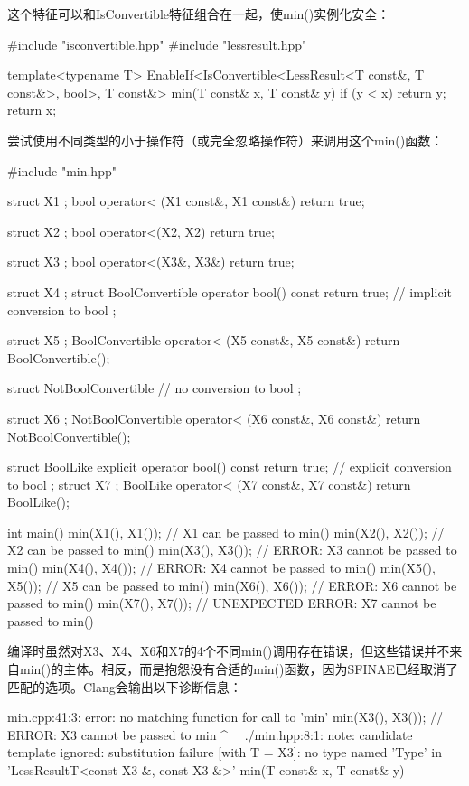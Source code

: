 这个特征可以和IsConvertible特征组合在一起，使min()实例化安全：

\begin{cpp}
#include "isconvertible.hpp"
#include "lessresult.hpp"

template<typename T>
EnableIf<IsConvertible<LessResult<T const&, T const&>, bool>,
		T const&>
min(T const& x, T const& y) {
	if (y < x) {
		return y;
	}
	return x;
}
\end{cpp}

尝试使用不同类型的小于操作符（或完全忽略操作符）来调用这个min()函数：

\begin{cpp}
#include "min.hpp"

struct X1 { };
bool operator< (X1 const&, X1 const&) { return true; }

struct X2 { };
bool operator<(X2, X2) { return true; }

struct X3 { };
bool operator<(X3&, X3&) { return true; }

struct X4 { };
struct BoolConvertible {
	operator bool() const { return true; } // implicit conversion to bool
};

struct X5 { };
BoolConvertible operator< (X5 const&, X5 const&) {
	return BoolConvertible();
}

struct NotBoolConvertible { // no conversion to bool
};

struct X6 { };
NotBoolConvertible operator< (X6 const&, X6 const&) {
	return NotBoolConvertible();
}

struct BoolLike {
	explicit operator bool() const { return true; } // explicit conversion to bool
};
struct X7 { };
BoolLike operator< (X7 const&, X7 const&) { return BoolLike(); }

int main() {
	min(X1(), X1()); // X1 can be passed to min()
	min(X2(), X2()); // X2 can be passed to min()
	min(X3(), X3()); // ERROR: X3 cannot be passed to min()
	min(X4(), X4()); // ERROR: X4 cannot be passed to min()
	min(X5(), X5()); // X5 can be passed to min()
	min(X6(), X6()); // ERROR: X6 cannot be passed to min()
	min(X7(), X7()); // UNEXPECTED ERROR: X7 cannot be passed to min()
}
\end{cpp}

编译时虽然对X3、X4、X6和X7的4个不同min()调用存在错误，但这些错误并不来自min()的主体。相反，而是抱怨没有合适的min()函数，因为SFINAE已经取消了匹配的选项。Clang会输出以下诊断信息：

\begin{shell}
min.cpp:41:3: error: no matching function for call to 'min'
min(X3(), X3()); // ERROR: X3 cannot be passed to min
^~~
./min.hpp:8:1: note: candidate template ignored: substitution failure
[with T = X3]: no type named 'Type' in
'LessResultT<const X3 &, const X3 &>'
min(T const& x, T const& y)
\end{shell}

